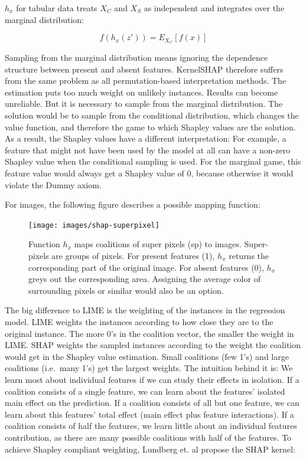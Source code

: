 \documentclass[12pt,]{krantz}
\begin{document}
\(h_x\) for tabular data treats \(X_C\) and \(X_S\) as independent and
integrates over the marginal distribution:

\[f(h_x(z'))=E_{X_C}[f(x)]\]

Sampling from the marginal distribution means ignoring the dependence
structure between present and absent features. KernelSHAP therefore
suffers from the same problem as all permutation-based interpretation
methods. The estimation puts too much weight on unlikely instances.
Results can become unreliable. But it is necessary to sample from the
marginal distribution. The solution would be to sample from the
conditional distribution, which changes the value function, and
therefore the game to which Shapley values are the solution. As a
result, the Shapley values have a different interpretation: For example,
a feature that might not have been used by the model at all can have a
non-zero Shapley value when the conditional sampling is used. For the
marginal game, this feature value would always get a Shapley value of 0,
because otherwise it would violate the Dummy axiom.

For images, the following figure describes a possible mapping function:

\begin{figure}

{\centering \texttt{[image: images/shap-superpixel]} 

}

\caption{Function $h_x$ maps coalitions of super pixels (sp) to images. Super-pixels are groups of pixels. For present features (1), $h_x$ returns the corresponding part of the original image. For absent features (0), $h_x$ greys out the corresponding area. Assigning the average color of surrounding pixels or similar would also be an option.}\label{fig:unnamed-chunk-43}
\end{figure}

The big difference to LIME is the weighting of the instances in the
regression model. LIME weights the instances according to how close they
are to the original instance. The more 0's in the coalition vector, the
smaller the weight in LIME. SHAP weights the sampled instances according
to the weight the coalition would get in the Shapley value estimation.
Small coalitions (few 1's) and large coalitions (i.e.~many 1's) get the
largest weights. The intuition behind it is: We learn most about
individual features if we can study their effects in isolation. If a
coalition consists of a single feature, we can learn about the features'
isolated main effect on the prediction. If a coalition consists of all
but one feature, we can learn about this features' total effect (main
effect plus feature interactions). If a coalition consists of half the
features, we learn little about an individual features contribution, as
there are many possible coalitions with half of the features. To achieve
Shapley compliant weighting, Lundberg et. al propose the SHAP kernel:
\end{document}
